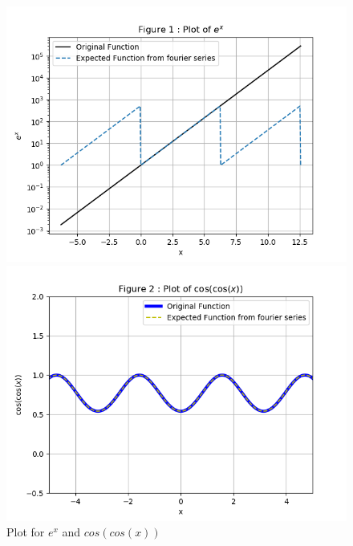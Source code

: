 \documentclass[11pt, a4paper]{article}
\begin{document}
     \begin{figure}[!tbh]
      \centering
      \includegraphics[scale=0.7]{./../Extras/1.png}  %
      
      \includegraphics[scale=0.7]{./../Extras/2.png}  %
      \caption{Plot for $e^x$ and $cos(cos(x))$}
    \end{figure}
     \break\break
\end{document}
